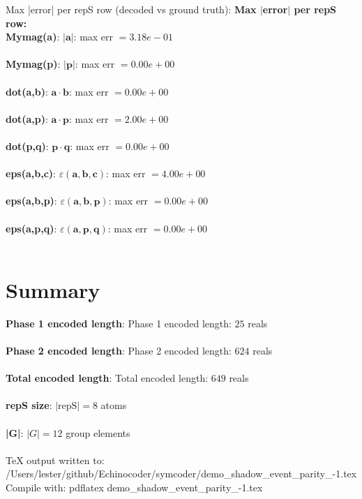 \documentclass[a4paper,11pt]{article}
\newcommand{\vc}[1]{\ensuremath{\mathbf{#1}}}
\newcommand{\dnfagmiihhiejm}[1]{|\vc{#1}|}
\newcommand{\pdcegfomjfhook}[2]{\mathbf{#1} \cdot \mathbf{#2}}
\newcommand{\kblbmcpggoncpf}[3]{\varepsilon(\mathbf{#1},\mathbf{#2},\mathbf{#3})}
\begin{document}
  Max |error| per repS row (decoded vs ground truth):
\textbf{Max $|$error$|$ per repS row:}\\
\textbf{    Mymag(a)}: $\dnfagmiihhiejm{a}$: max err $= 3.18e-01$\\\\
\textbf{    Mymag(p)}: $\dnfagmiihhiejm{p}$: max err $= 0.00e+00$\\\\
\textbf{    dot(a,b)}: $\pdcegfomjfhook{a}{b}$: max err $= 0.00e+00$\\\\
\textbf{    dot(a,p)}: $\pdcegfomjfhook{a}{p}$: max err $= 2.00e+00$\\\\
\textbf{    dot(p,q)}: $\pdcegfomjfhook{p}{q}$: max err $= 0.00e+00$\\\\
\textbf{    eps(a,b,c)}: $\kblbmcpggoncpf{a}{b}{c}$: max err $= 4.00e+00$\\\\
\textbf{    eps(a,b,p)}: $\kblbmcpggoncpf{a}{b}{p}$: max err $= 0.00e+00$\\\\
\textbf{    eps(a,p,q)}: $\kblbmcpggoncpf{a}{p}{q}$: max err $= 0.00e+00$\\\\

\section{Summary}
\textbf{  Phase 1 encoded length}: Phase 1 encoded length: $25$ reals\\\\
\textbf{  Phase 2 encoded length}: Phase 2 encoded length: $624$ reals\\\\
\textbf{  Total encoded length}: Total encoded length: $649$ reals\\\\
\textbf{  repS size}: $|\text{repS}| = 8$ atoms\\\\
\textbf{  |G|}: $|G| = 12$ group elements\\\\

  TeX output written to: /Users/lester/github/Echinocoder/symcoder/demo\_shadow\_event\_parity\_-1.tex
  Compile with:  pdflatex demo\_shadow\_event\_parity\_-1.tex
\end{document}
